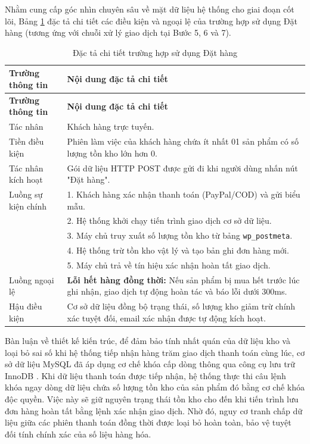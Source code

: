 Nhằm cung cấp góc nhìn chuyên sâu về mặt dữ liệu hệ thống cho giai đoạn cốt lõi, Bảng \ref{tab:use_case_checkout} đặc tả chi tiết các điều kiện và ngoại lệ của trường hợp sử dụng Đặt hàng (tương ứng với chuỗi xử lý giao dịch tại Bước 5, 6 và 7).

\begin{longtable}{lp{9cm}}
\caption{Đặc tả chi tiết trường hợp sử dụng Đặt hàng}
\label{tab:use_case_checkout} \\
\toprule
\textbf{Trường thông tin} & \textbf{Nội dung đặc tả chi tiết} \\ \midrule
\endfirsthead

\toprule
\textbf{Trường thông tin} & \textbf{Nội dung đặc tả chi tiết} \\ \midrule
\endhead

\bottomrule
\endlastfoot

Tác nhân & Khách hàng trực tuyến. \\ \addlinespace
Tiền điều kiện & Phiên làm việc của khách hàng chứa ít nhất 01 sản phẩm có số lượng tồn kho lớn hơn 0. \\ \addlinespace
Tác nhân kích hoạt & Gói dữ liệu HTTP POST được gửi đi khi người dùng nhấn nút "Đặt hàng". \\ \addlinespace
Luồng sự kiện chính 
& 1. Khách hàng xác nhận thanh toán (PayPal/COD) và gửi biểu mẫu. \\
& 2. Hệ thống khởi chạy tiến trình giao dịch cơ sở dữ liệu. \\
& 3. Máy chủ truy xuất số lượng tồn kho từ bảng \texttt{wp\_postmeta}. \\
& 4. Hệ thống trừ tồn kho vật lý và tạo bản ghi đơn hàng mới. \\
& 5. Máy chủ trả về tín hiệu xác nhận hoàn tất giao dịch. \\ \addlinespace

Luồng ngoại lệ & \textbf{Lỗi hết hàng đồng thời:} Nếu sản phẩm bị mua hết trước lúc ghi nhận, giao dịch tự động hoàn tác và báo lỗi dưới 300ms. \\ \addlinespace
Hậu điều kiện & Cơ sở dữ liệu đồng bộ trạng thái, số lượng kho giảm trừ chính xác tuyệt đối, email xác nhận được tự động kích hoạt. \\
\end{longtable}

Bàn luận về thiết kế kiến trúc, để đảm bảo tính nhất quán của dữ liệu kho và loại bỏ sai số khi hệ thống tiếp nhận hàng trăm giao dịch thanh toán cùng lúc, cơ sở dữ liệu MySQL đã áp dụng cơ chế khóa cấp dòng thông qua công cụ lưu trữ InnoDB \cite{mysql_innodb}. Khi dữ liệu thanh toán được tiếp nhận, hệ thống thực thi câu lệnh khóa ngay dòng dữ liệu chứa số lượng tồn kho của sản phẩm đó bằng cơ chế khóa độc quyền. Việc này sẽ giữ nguyên trạng thái tồn kho cho đến khi tiến trình lưu đơn hàng hoàn tất bằng lệnh xác nhận giao dịch. Nhờ đó, nguy cơ tranh chấp dữ liệu giữa các phiên thanh toán đồng thời được loại bỏ hoàn toàn, bảo vệ tuyệt đối tính chính xác của số liệu hàng hóa.

